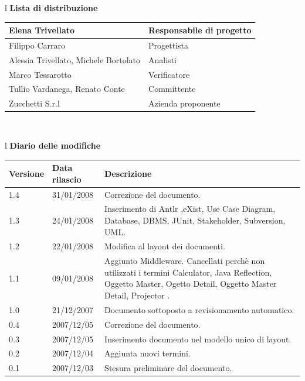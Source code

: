 \documentclass[11pt,titlepage,a4paper]{report}
\begin{document}
\begin{center}
\begin{table}[hbtp]
\large{
\begin{tabular}{l}
\Large{\textbf{\textsf{Lista di distribuzione}}} \\
\begin{tabular}{||p{6cm}||p{6cm}||} \hline
{Elena Trivellato}& Responsabile di progetto \\ \hline 
{Filippo Carraro}& Progettista \\ \hline
{Alessia Trivellato, Michele Bortolato}& Analisti \\ \hline
{Marco Tessarotto}& Verificatore \\ \hline
{Tullio Vardanega, Renato Conte}& Committente \\ \hline 
{Zucchetti S.r.l}& Azienda proponente\\ \hline
\end{tabular} \\
\end{tabular}
}
\end{table}
\begin{table}[hbtp]
\large{
\begin{tabular}{l}
\Large{\textbf{\textsf{Diario delle modifiche}}} \\
\begin{tabular}{||p{2cm}||p{3.5cm}||p{6cm}||} \hline
\textbf{Versione} & \textbf{Data rilascio} & \textbf{Descrizione} \\ \hline
1.4 & 31/01/2008 & Correzione del documento.\\ \hline
1.3 & 24/01/2008 & Inserimento di Antlr ,eXist, Use Case Diagram, Database, DBMS, JUnit, Stakeholder, Subversion, UML.\\ \hline
1.2 & 22/01/2008 & Modifica al layout dei documenti.\\ \hline
1.1 & 09/01/2008 & Aggiunto Middleware. Cancellati perch\`e non utilizzati i termini Calculator, Java Reflection, Oggetto Master, Ogetto Detail, Oggetto Master Detail, Projector .\\ \hline
1.0 & 21/12/2007 & Documento sottoposto a revisionamento automatico.\\ \hline
0.4 & 2007/12/05 & Correzione del documento. \\ \hline
0.3 & 2007/12/05 & Inserimento documento nel modello unico di layout. \\ \hline
0.2 & 2007/12/04 & Aggiunta nuovi termini. \\ \hline
0.1 & 2007/12/03 & Stesura preliminare del documento. \\ \hline

\end{tabular} \\
\end{tabular}

}
\end{table}
\end{center}
\newpage
\tableofcontents
\end{document}
